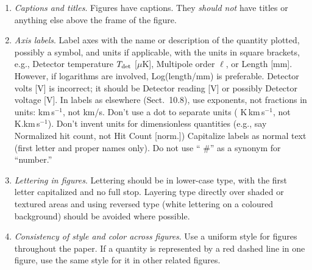 \documentclass[letterpaper,11pt]{article}
\begin{document}
\begin{enumerate}
Sky images should always have coordinates indicated by a labelled frame or
graticule.  Use sexagesimal notation (e.g., h,m,s of RA and d,m,s of Dec) or
decimal degrees, but do not mix the two: if you refer to a source RA of
$12^{\rm h}\,30^{\rm m}$ in the text or a table, do not use 187.5\degree in a
figure!

\item {\it Captions and titles\/}.  Figures have captions.  They {\it should
not\/} have titles or anything else above the frame of the figure.

\item {\it Axis labels\/}. Label axes with the name or description of the
quantity plotted, possibly a symbol, and units if applicable, with the units
in square brackets, e.g., { Detector temperature $T_{\rm det}$ [$\mu$K]},
{ Multipole order $\ell$}, or { Length [mm]}.  However, if logarithms
are involved, { Log(length/mm)} is preferable.  { Detector volts [V]}
is incorrect; it should be { Detector reading [V]} or possibly
{ Detector voltage [V]}.  In labels as elsewhere (Sect.~10.8), use exponents,
not fractions in units: { km\,s$^{-1}$}, not { km/s}.  Don't use a dot
to separate units ({ K\,km\,s$^{-1}$}, not { K.km\,s$^{-1}$}).  Don't
invent units for dimensionless quantities (e.g., say { Normalized hit
count}, not { Hit Count [norm.]})  Capitalize labels as normal text (first
letter and proper names only).  Do not use ``{ \#}'' as a synonym for
``number.''

\item {\it Lettering in figures\/}.  Lettering should be in lower-case type,
with the first letter capitalized and no full stop.  Layering type directly
over shaded or textured areas and using reversed type (white lettering on a
coloured background) should be avoided where possible.


\item {\it Consistency of style and color across figures\/}.  Use a uniform
style for figures throughout the paper.  If a quantity is represented by a red
dashed line in one figure, use the same style for it in other related figures.  


\end{enumerate}
\end{document}
